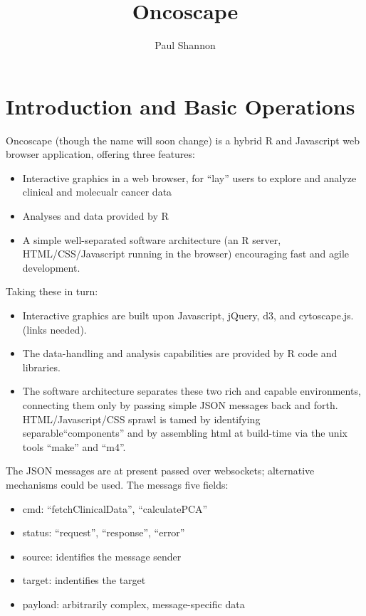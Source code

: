 \documentclass{article}
\title{Oncoscape}
\author{Paul Shannon}
\begin{document}
 

\maketitle

\section{Introduction and Basic Operations}

Oncoscape (though the name will soon change) is a hybrid R and Javascript web browser application, offering three features:

\begin{itemize}
    \item Interactive graphics in a web browser, for ``lay'' users to explore and analyze clinical and molecualr cancer data
    \item Analyses and data provided by R
    \item A simple well-separated software architecture (an R server, HTML/CSS/Javascript running in the browser) encouraging fast 
      and agile development.  
\end{itemize}

Taking these in turn:

\begin{itemize}
    \item Interactive graphics are built upon Javascript, jQuery, d3, and cytoscape.js. (links needed).  
    \item The data-handling and analysis capabilities are provided by R code and libraries.
    \item The software architecture separates these two rich and capable environments, connecting them
         only by passing simple JSON messages back and forth.  HTML/Javascript/CSS sprawl is tamed by
         identifying separable``components'' and by assembling html at build-time via the unix tools ``make'' and ``m4''.
\end{itemize}

The JSON messages are at present passed over websockets; alternative mechanisms could be used.  The messags five fields:

\begin{itemize}
    \item cmd:  ``fetchClinicalData'', ``calculatePCA''
    \item status: ``request'', ``response'', ``error''
    \item source:  identifies the message sender
    \item target:  indentifies the target
    \item payload:  arbitrarily complex, message-specific data
\end{itemize}
\end{document}
